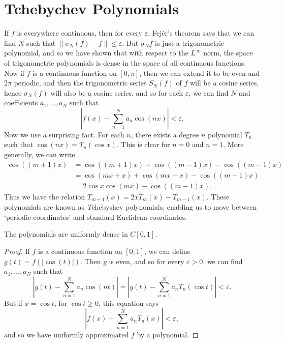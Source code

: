 \section{Tchebychev Polynomials}

If $f$ is everywhere continuous, then for every $\varepsilon$, Fej\'{e}r's theorem says that we can find $N$ such that $\| \sigma_N(f) - f \| \leq \varepsilon$. But $\sigma_N f$ is just a trigonometric polynomial, and so we have shown that with respect to the $L^\infty$ norm, the space of trigonometric polynomials is dense in the space of all continuous functions.  Now if $f$ is a continuous function on $[0,\pi]$, then we can extend it to be even and $2\pi$ periodic, and then the trigonometric series $S_N(f)$ of $f$ will be a cosine series, hence $\sigma_N(f)$ will also be a cosine series, and so for each $\varepsilon$, we can find $N$ and coefficients $a_1, \dots, a_N$ such that
%
\[ \left| f(x) - \sum_{n = 1}^N a_n \cos(nx) \right| < \varepsilon. \]
%
Now we use a surprising fact. For each $n$, there exists a degree $n$ polynomial $T_n$ such that $\cos(nx) = T_n(\cos x)$. This is clear for $n = 0$ and $n = 1$. More generally, we can write
%
\begin{align*}
    \cos((m+1)x) &= \cos((m+1)x) + \cos((m-1)x) - \cos((m-1)x)\\
    &= \cos(mx + x) + \cos(mx - x) - \cos((m-1)x)\\
    &= 2 \cos x \cos(mx) - \cos((m-1)x).
\end{align*}
%
Thus we have the relation  $T_{m+1}(x) = 2xT_m(x) - T_{m-1}(x)$. These polynomials are known as {\emph Tchebyshev polynomials}, enabling us to move between `periodic coordinates' and standard Euclidean coordinates.

\begin{corollary}[Weirstrass]
    The polynomials are uniformly dense in $C[0,1]$.
\end{corollary}
\begin{proof}
    If $f$ is a continuous function on $[0,1]$, we can define $g(t) = f(|\cos(t)|)$. Then $g$ is even, and so for every $\varepsilon > 0$, we can find $a_1, \dots, a_N$ such that
    \[ \left|g(t) - \sum_{n = 1}^N a_n \cos(nt) \right| = \left| g(t) - \sum_{n = 1}^N a_n T_n(\cos t) \right| < \varepsilon. \]
    But if $x = \cos t$, for $\cos t \geq 0$, this equation says
    \[ \left| f(x) - \sum_{n = 1}^N a_n T_n(x) \right| < \varepsilon, \]
    and so we have uniformly approximated $f$ by a polynomial.
\end{proof}

